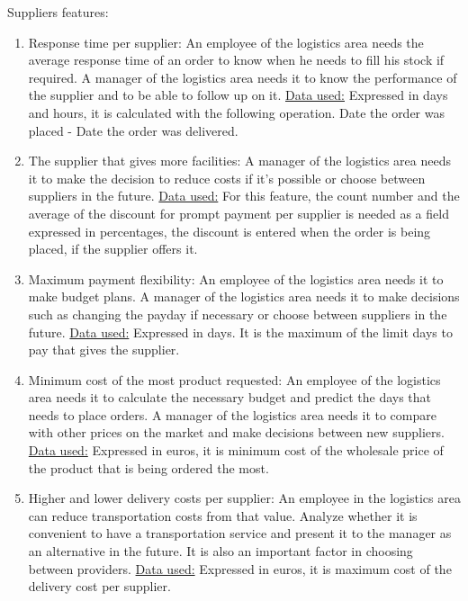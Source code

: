 \documentclass{article}
\begin{document}
\noindent Suppliers features:
\begin{enumerate}
  \item Response time per supplier: An employee of the logistics area needs the average response time of an order to know when he needs to fill his stock if required. A manager of the logistics area needs it to know the performance of the supplier and to be able to follow up on it. \underline{Data used:} Expressed in days and hours, it is calculated with the following operation. Date the order was placed - Date the order was delivered.
  \item The supplier that gives more facilities: A manager of the logistics area needs it to make the decision to reduce costs if it’s possible or choose between suppliers in the future. \underline{Data used:} For this feature, the count number and the average of the discount for prompt payment per supplier is needed as a field expressed in percentages, the discount is entered when the order is being placed, if the supplier offers it.
  \item Maximum payment flexibility: An employee of the logistics area needs it to make budget plans. A manager of the logistics area needs it to make decisions such as changing the payday if necessary or choose between suppliers in the future. \underline{Data used:} Expressed in days. It is the maximum of the limit days to pay that gives the supplier.
  \item Minimum cost of the most product requested: An employee of the logistics area needs it to calculate the necessary budget and predict the days that needs to place orders. A manager of the logistics area needs it to compare with other prices on the market and make decisions between new suppliers. \underline{Data used:} Expressed in euros, it is minimum cost of the wholesale price of the product that is being ordered the most.
  \item Higher and lower delivery costs per supplier: An employee in the logistics area can reduce transportation costs from that value. Analyze whether it is convenient to have a transportation service and present it to the manager as an alternative in the future. It is also an important factor in choosing between providers. \underline{Data used:} Expressed in euros, it is maximum cost of the delivery cost per supplier.
\end{enumerate}
\end{document}
